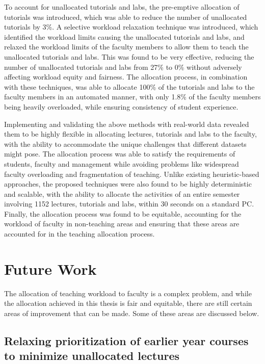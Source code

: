 To account for unallocated tutorials and labs, the pre-emptive allocation of tutorials was introduced, which was able to reduce the number of unallocated tutorials by 3\%. A selective workload relaxation technique was introduced, which identified the workload limits causing the unallocated tutorials and labs, and relaxed the workload limits of the faculty members to allow them to teach the unallocated tutorials and labs. This was found to be very effective, reducing the number of unallocated tutorials and labs from 27\% to 0\% without adversely affecting workload equity and fairness. The allocation process, in combination with these techniques, was able to allocate 100\% of the tutorials and labs to the faculty members in an automated manner, with only 1.8\% of the faculty members being heavily overloaded, while ensuring consistency of student experience.

Implementing and validating the above methods with real-world data revealed them to be highly flexible in allocating lectures, tutorials and labs to the faculty, with the ability to accommodate the unique challenges that different datasets might pose. The allocation process was able to satisfy the requirements of students, faculty and management while avoiding problems like widespread faculty overloading and fragmentation of teaching. Unlike existing heuristic-based approaches, the proposed techniques were also found to be highly deterministic and scalable, with the ability to allocate the activities of an entire semester involving 1152 lectures, tutorials and labs, within 30 seconds on a standard PC. Finally, the allocation process was found to be equitable, accounting for the workload of faculty in non-teaching areas and ensuring that these areas are accounted for in the teaching allocation process.


\section{Future Work}

The allocation of teaching workload to faculty is a complex problem, and while the allocation achieved in this thesis is fair and equitable, there are still certain areas of improvement that can be made. Some of these areas are discussed below.

\subsection{Relaxing prioritization of earlier year courses to minimize unallocated lectures}

